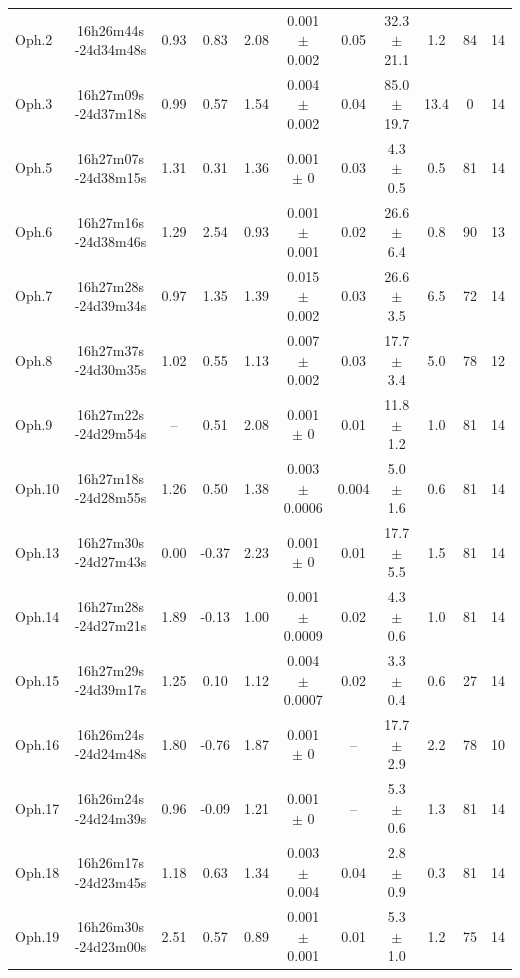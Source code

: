 \begin{landscape}
\begin{table}[!h]
\begin{center}
\begin{longtable}{lcccccccccc}
Oph.2	&	16h26m44s -24d34m48s	&	0.93	&	0.83	&	2.08	&	0.001	$\pm$	0.002	&	0.05	&	32.3	$\pm$	21.1	&	1.2	&	84	&	14	\\
Oph.3	&	16h27m09s -24d37m18s	&	0.99	&	0.57	&	1.54	&	0.004	$\pm$	0.002	&	0.04	&	85.0	$\pm$	19.7	&	13.4	&	0	&	14	\\
Oph.5	&	16h27m07s -24d38m15s	&	1.31	&	0.31	&	1.36	&	0.001	$\pm$	0	&	0.03	&	4.3	$\pm$	0.5	&	0.5	&	81	&	14	\\
Oph.6	&	16h27m16s -24d38m46s	&	1.29	&	2.54	&	0.93	&	0.001	$\pm$	0.001	&	0.02	&	26.6	$\pm$	6.4	&	0.8	&	90	&	13	\\
Oph.7	&	16h27m28s -24d39m34s	&	0.97	&	1.35	&	1.39	&	0.015	$\pm$	0.002	&	0.03	&	26.6	$\pm$	3.5	&	6.5	&	72	&	14	\\
Oph.8	&	16h27m37s -24d30m35s	&	1.02	&	0.55	&	1.13	&	0.007	$\pm$	0.002	&	0.03	&	17.7	$\pm$	3.4	&	5.0	&	78	&	12	\\
Oph.9	&	16h27m22s -24d29m54s	&	--	&	0.51	&	2.08	&	0.001	$\pm$	0	&	0.01	&	11.8	$\pm$	1.2	&	1.0	&	81	&	14	\\
Oph.10	&	16h27m18s -24d28m55s	&	1.26	&	0.50	&	1.38	&	0.003	$\pm$	0.0006	&	0.004	&	5.0	$\pm$	1.6	&	0.6	&	81	&	14	\\
Oph.13	&	16h27m30s -24d27m43s	&	0.00	&	-0.37	&	2.23	&	0.001	$\pm$	0	&	0.01	&	17.7	$\pm$	5.5	&	1.5	&	81	&	14	\\
Oph.14	&	16h27m28s -24d27m21s	&	1.89	&	-0.13	&	1.00	&	0.001	$\pm$	0.0009	&	0.02	&	4.3	$\pm$	0.6	&	1.0	&	81	&	14	\\
Oph.15	&	16h27m29s -24d39m17s	&	1.25	&	0.10	&	1.12	&	0.004	$\pm$	0.0007	&	0.02	&	3.3	$\pm$	0.4	&	0.6	&	27	&	14	\\
Oph.16	&	16h26m24s -24d24m48s	&	1.80	&	-0.76	&	1.87	&	0.001	$\pm$	0	&	--	&	17.7	$\pm$	2.9	&	2.2	&	78	&	10	\\
Oph.17	&	16h26m24s -24d24m39s	&	0.96	&	-0.09	&	1.21	&	0.001	$\pm$	0	&	--	&	5.3	$\pm$	0.6	&	1.3	&	81	&	14	\\
Oph.18	&	16h26m17s -24d23m45s	&	1.18	&	0.63	&	1.34	&	0.003	$\pm$	0.004	&	0.04	&	2.8	$\pm$	0.9	&	0.3	&	81	&	14	\\
Oph.19	&	16h26m30s -24d23m00s	&	2.51	&	0.57	&	0.89	&	0.001	$\pm$	0.001	&	0.01	&	5.3	$\pm$	1.0	&	1.2	&	75	&	14	\\
\bottomrule																									
\end{longtable}																																	
\end{center}																						
\end{table}	
\end{landscape}			


